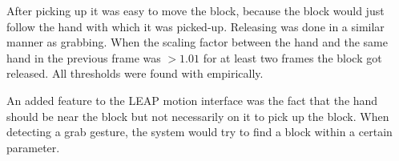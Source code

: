 After picking up it was easy to move the block, because the block would just follow the hand with which it was picked-up. Releasing was done in a similar manner as grabbing. When the scaling factor between the hand and the same hand in the previous frame was $>1.01$ for at least two frames the block got released. All thresholds were found with empirically.

An added feature to the LEAP motion interface was the fact that the hand should be near the block but not necessarily  on it to pick up the block. When detecting a grab gesture, the system would try to find a block within a certain parameter.